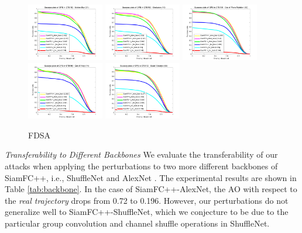 \documentclass[journal]{IEEEtran}
\newcommand{\ie}{i.e.}
\begin{document}
\begin{figure}[t!]
\begin{center}
    \includegraphics[width=0.3\textwidth]{images/OTB2015/success_plot_OPE_OTB100_MB.png}
    \includegraphics[width=0.3\textwidth]{images/OTB2015/success_plot_OPE_OTB100_OCC.png}
    \includegraphics[width=0.3\textwidth]{images/OTB2015/success_plot_OPE_OTB100_OPR.png}
    \includegraphics[width=0.3\textwidth]{images/OTB2015/success_plot_OPE_OTB100_OV.png}
    \includegraphics[width=0.3\textwidth]{images/OTB2015/success_plot_OPE_OTB100_SV.png}
  \end{center}
     \caption{FDSA}
  \label{fig:globally_uav20l_1}
\end{figure}

\textit{Transferability to Different Backbones} We evaluate the transferability of our attacks when applying the perturbations to two more different backbones of SiamFC++, \ie, ShuffleNet \cite{ShuffleNet} and AlexNet \cite{AlexNet}.
The experimental results are shown in Table \ref{tab:backbone}. In the case of SiamFC++-AlexNet, the AO with respect to the \textit{real trajectory} drops from 0.72 to 0.196. However, our perturbations do not generalize well to SiamFC++-ShuffleNet, which we conjecture to be due to the particular group convolution and channel shuffle operations in ShuffleNet.
\end{document}
